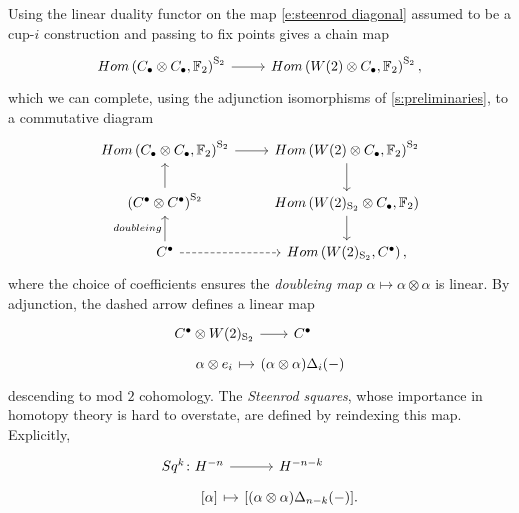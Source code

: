 Using the linear duality functor on the map \eqref{e:steenrod diagonal} assumed to be a cup-$i$ construction and passing to fix points gives a chain map
\begin{equation*}
\begin{tikzcd}
Hom\left(C_\bullet \otimes C_\bullet, \F_2 \right)^{\mathrm S_2} \arrow[r] &
Hom\left(W(2) \otimes C_\bullet, \F_2 \right)^{\mathrm S_2},
\end{tikzcd}
\end{equation*}
which we can complete, using the adjunction isomorphisms of \cref{s:preliminaries}, to a commutative diagram
\begin{equation*}
\begin{tikzcd}
Hom\left(C_\bullet \otimes C_\bullet, \F_2 \right)^{\mathrm S_2} \arrow[r] &
Hom\left(W(2) \otimes C_\bullet, \F_2 \right)^{\mathrm S_2} \arrow[d] \\
\left(C^\bullet \otimes C^\bullet\right)^{\mathrm S_2} \arrow[u]&
Hom\left(W(2)_{\mathrm S_2} \otimes C_\bullet, \F_2 \right) \arrow[d] \\
C^\bullet \arrow[u, "doubleing"] \arrow[r, dashed]&
Hom\left(W(2)_{\mathrm S_2}, C^\bullet\right),
\end{tikzcd}
\end{equation*}
where the choice of coefficients ensures the \textit{doubleing map} $\alpha \mapsto \alpha \otimes \alpha$ is linear.
By adjunction, the dashed arrow defines a linear map
\begin{equation} \label{e:Steenrod squares parameterized}
\begin{tikzcd}[row sep=tiny, column sep = tiny]
C^\bullet \otimes W(2)_{\mathrm S_2} \arrow[r] &[-10pt] C^\bullet \\
\alpha \otimes e_i \arrow[r, |->] & (\alpha \otimes \alpha)\Delta_i(-)
\end{tikzcd}
\end{equation}
descending to mod $2$ cohomology.
The \textit{Steenrod squares}, whose importance in homotopy theory is hard to overstate, are defined by reindexing this map.
Explicitly,
\begin{equation*}
\begin{tikzcd}[row sep=tiny, column sep=tiny]
Sq^k \colon H^{-n} \arrow[r] & H^{-n-k} \\
\phantom{Sq^k \colon}{[\alpha]} \arrow[r, |->] & {\left[(\alpha \otimes \alpha)\Delta_{n-k}(-) \right]}.
\end{tikzcd}
\end{equation*}

